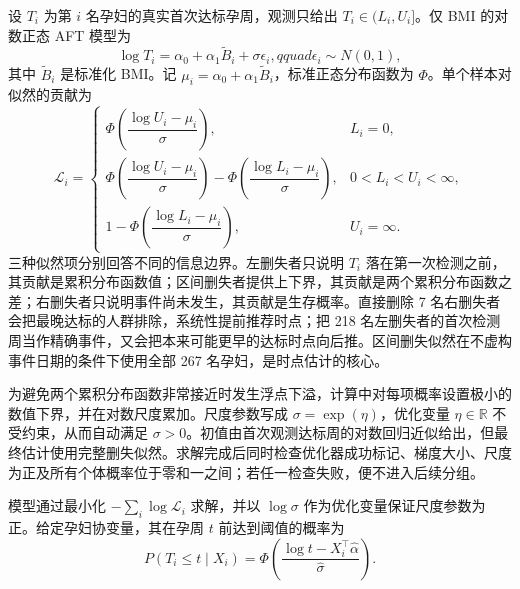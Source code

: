 \documentclass[UTF8,a4paper,12pt]{ctexart}
\begin{document}
设 $T_i$ 为第 $i$ 名孕妇的真实首次达标孕周，观测只给出 $T_i\in(L_i,U_i]$。仅 BMI 的对数正态 AFT 模型为
\begin{equation}
\log T_i=\alpha_0+\alpha_1\widetilde B_i+\sigma\epsilon_i,qquad \epsilon_i\sim N(0,1),
\label{eq:aft}
\end{equation}
其中 $\widetilde B_i$ 是标准化 BMI。记 $\mu_i=\alpha_0+\alpha_1\widetilde B_i$，标准正态分布函数为 $\Phi$。单个样本对似然的贡献为
\begin{equation}
\mathcal L_i=
\begin{cases}
\Phi\!\left(\dfrac{\log U_i-\mu_i}{\sigma}\right), & L_i=0,\\[6pt]
\Phi\!\left(\dfrac{\log U_i-\mu_i}{\sigma}\right)-
\Phi\!\left(\dfrac{\log L_i-\mu_i}{\sigma}\right), & 0<L_i<U_i<\infty,\\[6pt]
1-\Phi\!\left(\dfrac{\log L_i-\mu_i}{\sigma}\right), & U_i=\infty.
\end{cases}
\label{eq:likelihood}
\end{equation}
三种似然项分别回答不同的信息边界。左删失者只说明 $T_i$ 落在第一次检测之前，其贡献是累积分布函数值；区间删失者提供上下界，其贡献是两个累积分布函数之差；右删失者只说明事件尚未发生，其贡献是生存概率。直接删除 7 名右删失者会把最晚达标的人群排除，系统性提前推荐时点；把 218 名左删失者的首次检测周当作精确事件，又会把本来可能更早的达标时点向后推。区间删失似然在不虚构事件日期的条件下使用全部 267 名孕妇，是时点估计的核心。

为避免两个累积分布函数非常接近时发生浮点下溢，计算中对每项概率设置极小的数值下界，并在对数尺度累加。尺度参数写成 $\sigma=\exp(\eta)$，优化变量 $\eta\in\mathbb R$ 不受约束，从而自动满足 $\sigma>0$。初值由首次观测达标周的对数回归近似给出，但最终估计使用完整删失似然。求解完成后同时检查优化器成功标记、梯度大小、尺度为正及所有个体概率位于零和一之间；若任一检查失败，便不进入后续分组。

模型通过最小化 $-\sum_i\log\mathcal L_i$ 求解，并以 $\log\sigma$ 作为优化变量保证尺度参数为正。给定孕妇协变量，其在孕周 $t$ 前达到阈值的概率为
\begin{equation}
P(T_i\le t\mid X_i)=\Phi\!\left(\frac{\log t-X_i^\top\widehat\alpha}{\widehat\sigma}\right).
\label{eq:probability}
\end{equation}
\end{document}
